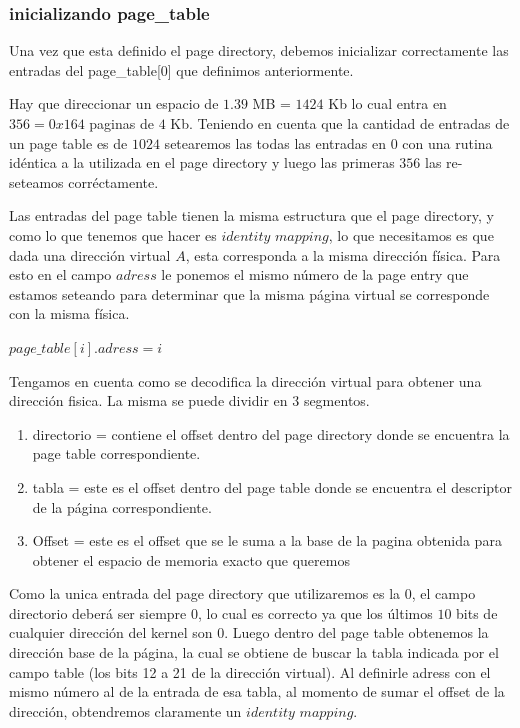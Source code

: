 \documentclass[a4paper,10pt,twoside]{article}
\begin{document}
\subsubsection{inicializando page\_table}
Una vez que esta definido el page directory, debemos inicializar correctamente las entradas del page\_table[0] que definimos anteriormente.

Hay que direccionar un espacio de $1.39$ MB =  $1424$ Kb lo cual entra en $356 = 0x164$ paginas de $4$ Kb. Teniendo en cuenta que la cantidad de entradas de un page table es de $1024$ setearemos las todas las entradas en $0$ con una rutina idéntica a la utilizada en el page directory y luego las primeras $356$ las re-seteamos corréctamente.

Las entradas del page table tienen la misma estructura que el page directory, y como lo que tenemos que hacer es $identity$ $mapping$, lo que necesitamos es que dada una dirección virtual $A$, esta corresponda a la misma dirección física. Para esto en el campo $adress$ le ponemos el mismo número de la page entry que estamos seteando para determinar que la misma página virtual se corresponde con la misma física.

$page\_table[i].adress = i$

Tengamos en cuenta como se decodifica la dirección virtual para obtener una dirección fisica. La misma se puede dividir en $3$ segmentos.

\begin{enumerate}
 \item directorio = contiene el offset dentro del page directory donde se encuentra la page table correspondiente.
 \item tabla = este es el offset dentro del page table donde se encuentra el descriptor de la página correspondiente.
 \item Offset = este es el offset que se le suma a la base de la pagina obtenida para obtener el espacio de memoria exacto que queremos
\end{enumerate}

Como la unica entrada del page directory que utilizaremos es la $0$, el campo directorio deberá ser siempre $0$, lo cual es correcto ya que los últimos $10$ bits de cualquier dirección del kernel son $0$. Luego dentro del page table obtenemos la dirección base de la página, la cual se obtiene de buscar la tabla indicada por el campo table (los bits 12 a 21 de la dirección virtual). Al definirle adress con el mismo número al de la entrada de esa tabla, al momento de sumar el offset de la dirección, obtendremos claramente un $identity$ $mapping$. \\
\end{document}
